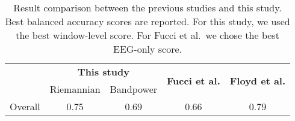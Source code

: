 \begin{table}[h]
    \begin{center}
        \begin{tabular}{lcccc}
            \toprule
            & \multicolumn{2}{c}{\textbf{This study}} & \multirow{2}{*}{\textbf{Fucci et al.}} & \multirow{2}{*}{\textbf{Floyd et al.}} \\
            \cmidrule(lr){2-3}
            & Riemannian & Bandpower & & \\
            \midrule
            Overall & 0.75 & 0.69 & 0.66 & 0.79 \\
            \bottomrule
        \end{tabular}
        \caption{Result comparison between the previous studies and this study. Best balanced accuracy scores are reported. For this study, we used the best window-level score. For Fucci et al.\ we chose the best EEG-only score.}\label{table:compare-results}
    \end{center}
\end{table}
